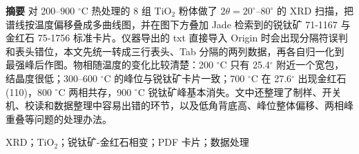 {\bfseries 摘要}\quad
对 200--900 $^\circ$C 热处理的 8 组 TiO$_2$ 粉体做了 $2\theta=20^\circ$--$80^\circ$ 的 XRD 扫描，把谱线按温度偏移叠成多曲线图，并在图下方叠加 Jade 检索到的锐钛矿 71-1167 与金红石 75-1756 标准卡片。仪器导出的 txt 直接导入 Origin 时会出现分隔符误判和表头错位，本文先统一转成三行表头、Tab 分隔的两列数据，再各自归一化到最强峰后作图。物相随温度的变化比较清楚：200 $^\circ$C 只有 25.4$^\circ$ 附近一个宽包，结晶度很低；300--600 $^\circ$C 的峰位与锐钛矿卡片一致；700 $^\circ$C 在 27.6$^\circ$ 出现金红石 (110)，800 $^\circ$C 两相共存，900 $^\circ$C 锐钛矿峰基本消失。文中还整理了制样、开关机、校读和数据整理中容易出错的环节，以及低角背底高、峰位整体偏移、两相峰重叠等问题的处理办法。

\vspace{4pt}

\par{}XRD；TiO$_2$；锐钛矿-金红石相变；PDF 卡片；数据处理
